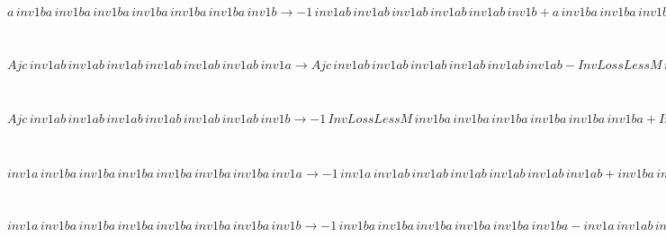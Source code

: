 \documentclass[rep10,leqno]{report}
\begin{document}
\begin{minipage}{6in}
$
a\,
 inv1ba\,
 inv1ba\,
 inv1ba\,
 inv1ba\,
 inv1ba\,
 inv1ba\,
 inv1b\rightarrow -1\,
 inv1ab\,
 inv1ab\,
 inv1ab\,
 inv1ab\,
 inv1ab\,
 inv1b + a\,
 inv1ba\,
 inv1ba\,
 inv1ba\,
 inv1ba\,
 inv1ba\,
 inv1ba + inv1ab\,
 inv1ab\,
 inv1ab\,
 inv1ab\,
 inv1ab\,
 inv1ab\,
 inv1b
$
\end{minipage}\medskip \\
\begin{minipage}{6in}
$
Ajc\,
 inv1ab\,
 inv1ab\,
 inv1ab\,
 inv1ab\,
 inv1ab\,
 inv1ab\,
 inv1a\rightarrow Ajc\,
 inv1ab\,
 inv1ab\,
 inv1ab\,
 inv1ab\,
 inv1ab\,
 inv1ab - InvLossLessM\,
 inv1ba\,
 inv1ba\,
 inv1ba\,
 inv1ba\,
 inv1ba\,
 inv1a + InvLossLessM\,
 inv1ba\,
 inv1ba\,
 inv1ba\,
 inv1ba\,
 inv1ba\,
 inv1ba\,
 inv1a
$
\end{minipage}\medskip \\
\begin{minipage}{6in}
$
Ajc\,
 inv1ab\,
 inv1ab\,
 inv1ab\,
 inv1ab\,
 inv1ab\,
 inv1ab\,
 inv1b\rightarrow -1\,
 InvLossLessM\,
 inv1ba\,
 inv1ba\,
 inv1ba\,
 inv1ba\,
 inv1ba\,
 inv1ba + InvLossLessM\,
 inv1ba\,
 inv1ba\,
 inv1ba\,
 inv1ba\,
 inv1ba\,
 inv1ba\,
 inv1b
$
\end{minipage}\medskip \\
\begin{minipage}{6in}
$
inv1a\,
 inv1ba\,
 inv1ba\,
 inv1ba\,
 inv1ba\,
 inv1ba\,
 inv1ba\,
 inv1a\rightarrow -1\,
 inv1a\,
 inv1ab\,
 inv1ab\,
 inv1ab\,
 inv1ab\,
 inv1ab\,
 inv1ab + inv1ba\,
 inv1ba\,
 inv1ba\,
 inv1ba\,
 inv1ba\,
 inv1ba\,
 inv1a + inv1a\,
 inv1ab\,
 inv1ab\,
 inv1ab\,
 inv1ab\,
 inv1ab\,
 inv1ab\,
 inv1a
$
\end{minipage}\medskip \\
\begin{minipage}{6in}
$
inv1a\,
 inv1ba\,
 inv1ba\,
 inv1ba\,
 inv1ba\,
 inv1ba\,
 inv1ba\,
 inv1b\rightarrow -1\,
 inv1ba\,
 inv1ba\,
 inv1ba\,
 inv1ba\,
 inv1ba\,
 inv1ba - inv1a\,
 inv1ab\,
 inv1ab\,
 inv1ab\,
 inv1ab\,
 inv1ab\,
 inv1b + inv1a\,
 inv1ba\,
 inv1ba\,
 inv1ba\,
 inv1ba\,
 inv1ba\,
 inv1ba + inv1ba\,
 inv1ba\,
 inv1ba\,
 inv1ba\,
 inv1ba\,
 inv1ba\,
 inv1b + inv1a\,
 inv1ab\,
 inv1ab\,
 inv1ab\,
 inv1ab\,
 inv1ab\,
 inv1ab\,
 inv1b
$
\end{minipage}\medskip \\
\end{document}
